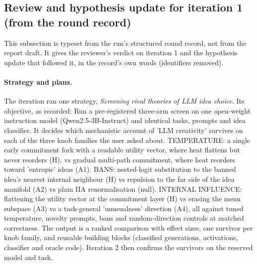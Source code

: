 \documentclass[11pt,letterpaper]{article}
\begin{document}
\subsection{Review and hypothesis update for iteration 1 (from the round record)}\label{sec:rec1}

This subsection is typeset from the run's structured round record, not from the report draft. It gives the reviewer's verdict on iteration 1 and the hypothesis update that followed it, in the record's own words (identifiers removed).

\paragraph{Strategy and plans.}

The iteration ran one strategy, \emph{Screening rival theories of LLM idea choice}. Its objective, as recorded: Run a pre-registered three-arm screen on one open-weight instruction model (Qwen2.5-3B-Instruct) and identical tasks, prompts and idea classifier. It decides which mechanistic account of 'LLM creativity' survives on each of the three knob families the user asked about. TEMPERATURE: a single early commitment fork with a readable utility vector, where heat flattens but never reorders (H), vs gradual multi-path commitment, where heat reorders toward 'entropic' ideas (A1). BANS: nested-logit substitution to the banned idea's nearest internal neighbour (H) vs repulsion to the far side of the idea manifold (A2) vs plain IIA renormalisation (null). INTERNAL INFLUENCE: flattening the utility vector at the commitment layer (H) vs erasing the menu subspace (A3) vs a task-general 'unusualness' direction (A4), all against tuned temperature, novelty prompts, bans and random-direction controls at matched correctness. The output is a ranked comparison with effect sizes, one survivor per knob family, and reusable building blocks (classified generations, activations, classifier and oracle code). Iteration 2 then confirms the survivors on the reserved model and task.
\end{document}
